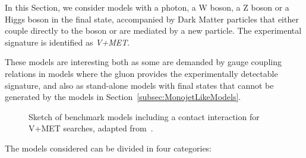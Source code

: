 
In this Section, we consider models with a photon, a W boson, a Z boson or a Higgs boson in the final state,
accompanied by Dark Matter particles that either couple directly to the boson or are mediated by
a new particle. The experimental signature is identified as \textit{V+MET}.

These models are interesting both as some are demanded by gauge coupling relations in models where the gluon provides
the experimentally detectable signature,
and also as stand-alone models with final states that cannot be generated by the models in
Section~\ref{subsec:MonojetLikeModels}.


\begin{figure}[h!]
  \centering
  \vspace{\baselineskip}
  \textwidth
  \begin{feynmandiagram}[modelVisr]
  \end{feynmandiagram}
  \begin{feynmandiagram}[modelVeft5pt]
  \end{feynmandiagram}
  \vspace{\baselineskip}
  \caption{Sketch of benchmark models including a contact interaction
  for V+MET searches, adapted from~\cite{Nelson:2013pqa}. \label{fig:VPlusMET_EFT}}
\end{figure}
%
The models considered can be divided in four categories:
